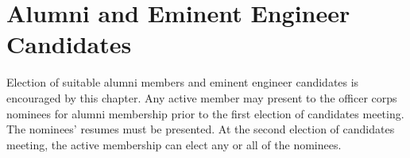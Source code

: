 \section{Alumni and Eminent Engineer Candidates} Election of suitable alumni members and eminent engineer candidates is encouraged by this chapter. Any active member may present to the officer corps nominees for alumni membership prior to the first election of candidates meeting. The nominees' resumes must be presented. At the second election of candidates meeting, the active membership can elect any or all of the nominees.